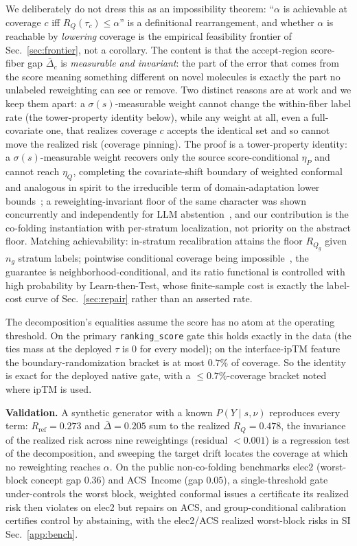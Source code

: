 \documentclass[10pt]{article}
\begin{document}
We deliberately do not dress this as an impossibility theorem: ``$\alpha$ is achievable at coverage $c$ iff
$R_Q(\tau_c)\le\alpha$'' is a definitional rearrangement, and whether $\alpha$ is reachable by \emph{lowering}
coverage is the empirical feasibility frontier of Sec.~\ref{sec:frontier}, not a corollary. The content is
that the accept-region score-fiber gap $\bar\Delta_c$ is \emph{measurable and invariant}: the part of the
error that comes from the score meaning something different on novel molecules is exactly the part no
unlabeled reweighting can see or remove. Two distinct reasons are at work and we keep them apart: a
$\sigma(s)$-measurable weight cannot change the within-fiber label rate (the tower-property identity below),
while any weight at all, even a full-covariate one, that realizes coverage $c$ accepts the identical set and
so cannot move the realized risk (coverage pinning). The proof is a tower-property identity: a
$\sigma(s)$-measurable weight recovers only the source score-conditional $\eta_P$ and cannot reach $\eta_Q$,
completing the covariate-shift boundary of weighted conformal~\citep{tibshirani2019} and analogous in spirit
to the irreducible term of domain-adaptation lower bounds~\citep{bendavid2010}; a reweighting-invariant
floor of the same character was shown concurrently and independently for LLM abstention~\citep{crcgupta},
and our contribution is the co-folding instantiation with per-stratum localization, not priority on the
abstract floor. Matching achievability: in-stratum recalibration attains the floor $R_{Q_g}$
given $n_g$ stratum labels; pointwise conditional coverage being impossible~\citep{barber2021limits}, the
guarantee is neighborhood-conditional, and its ratio functional is controlled with high probability by
Learn-then-Test, whose finite-sample cost is exactly the label-cost curve of Sec.~\ref{sec:repair} rather
than an asserted rate.

The decomposition's equalities assume the score has no atom at the operating threshold. On the primary
\texttt{ranking\_score} gate this holds exactly in the data (the ties mass at the deployed $\tau$ is $0$ for
every model); on the interface-ipTM feature the boundary-randomization bracket is at most $0.7\%$ of
coverage. So the identity is exact for the deployed native gate, with a $\le 0.7\%$-coverage bracket noted
where ipTM is used.

\textbf{Validation.} A synthetic generator with a known $P(Y\mid s,\nu)$ reproduces every term:
$R_{\mathrm{ref}}=0.273$ and $\bar\Delta=0.205$ sum to the realized $R_Q=0.478$, the invariance of the
realized risk across nine reweightings (residual $<0.001$) is a regression test of the decomposition, and
sweeping the target drift locates the coverage at which no reweighting reaches $\alpha$. On the public
non-co-folding benchmarks elec2 (worst-block concept gap $0.36$) and ACS~Income (gap $0.05$), a
single-threshold gate under-controls the worst block, weighted conformal issues a certificate its realized
risk then violates on elec2 but repairs on ACS, and group-conditional calibration certifies control by
abstaining, with the elec2/ACS realized worst-block risks in SI Sec.~\ref{app:bench}.
\end{document}
